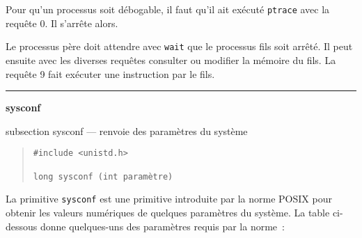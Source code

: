\documentclass [twoside] {report}
\newcommand {\primitive} [1]
    {
	\phantomsection
	{\large \bf #1}
	\addcontentsline {toc} {subsection} {#1}
    }
\newcommand {\separation}
    {
	\vspace {5mm}
	\nopagebreak
	\hrule
    }
\begin{document}
Pour qu'un processus soit débogable, il faut
qu'il ait exécuté {\tt ptrace} avec la requête 0. Il
s'arrête alors.

Le processus père doit attendre avec {\tt wait} que
le processus fils soit arrêté. Il peut ensuite
avec les diverses requêtes consulter ou modifier
la mémoire du fils. La requête 9 fait exécuter une
instruction par le fils.




\separation
\primitive {sysconf} --- renvoie des paramètres du système
    \label {sysconf}

\begin {quote}
\begin {verbatim}
#include <unistd.h>

long sysconf (int paramètre)
\end{verbatim}
\end {quote}

La primitive {\tt sysconf} est une primitive introduite
par la norme POSIX pour obtenir les valeurs numériques
de quelques paramètres du système. La table ci-dessous
donne quelques-uns des paramètres requis par la norme~:
\end{document}
